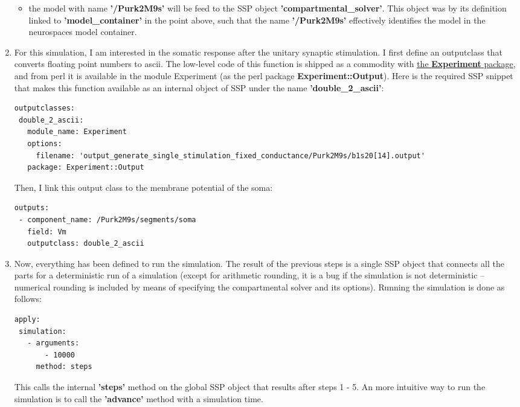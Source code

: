\documentclass[12pt]{article}
\begin{document}
\begin{enumerate}
\begin{itemize}
  \item the model with name {\bf '/Purk2M9s'} will be feed to the SSP
    object {\bf 'compartmental\_solver'}.  This object was by its
    definition linked to {\bf 'model\_container'} in the point above,
    such that the name {\bf '/Purk2M9s'} effectively identifies the
    model in the neurospaces model container.
  \end{itemize}

\item For this simulation, I am interested in the somatic response
  after the unitary synaptic stimulation.  I first define an
  outputclass that converts floating point numbers to ascii.  The
  low-level code of this function is shipped as a commodity with
  \href{../experiment/experiment.tex}{the {\bf Experiment} package},
  and from perl it is available in the module Experiment (as the perl
  package {\bf Experiment::Output}).  Here is the required SSP snippet
  that makes this function available as an internal object of SSP
  under the name {\bf 'double\_2\_ascii'}:

\begin{verbatim}
outputclasses:
 double_2_ascii:
   module_name: Experiment
   options:
     filename: 'output_generate_single_stimulation_fixed_conductance/Purk2M9s/b1s20[14].output'
   package: Experiment::Output
\end{verbatim}

  Then, I link this output class to the membrane potential of the
  soma:

\begin{verbatim}
outputs:
 - component_name: /Purk2M9s/segments/soma
   field: Vm
   outputclass: double_2_ascii
\end{verbatim}

\item Now, everything has been defined to run the simulation.  The
  result of the previous steps is a single SSP object that connects
  all the parts for a deterministic run of a simulation (except for
  arithmetic rounding, it is a bug if the simulation is not
  deterministic -- numerical rounding is included by means of
  specifying the compartmental solver and its options).  Running the
  simulation is done as follows:

\begin{verbatim}
apply:
 simulation:
   - arguments:
       - 10000
     method: steps
\end{verbatim}

  This calls the internal {\bf 'steps'} method on the global SSP
  object that results after steps 1 - 5.  An more intuitive way to run
  the simulation is to call the {\bf 'advance'} method with a
  simulation time.


\end{enumerate}
\end{document}
